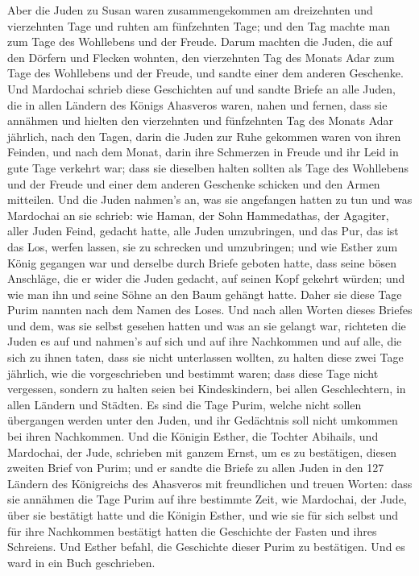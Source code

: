  Aber die Juden zu Susan waren zusammengekommen am
dreizehnten und vierzehnten Tage und ruhten am fünfzehnten Tage; und den
Tag machte man zum Tage des Wohllebens und der Freude. 
Darum machten die Juden, die auf den Dörfern und Flecken wohnten, den
vierzehnten Tag des Monats Adar zum Tage des Wohllebens und der Freude,
und sandte einer dem anderen Geschenke.  Und Mardochai
schrieb diese Geschichten auf und sandte Briefe an alle Juden, die in
allen Ländern des Königs Ahasveros waren, nahen und fernen,
 dass sie annähmen und hielten den vierzehnten und
fünfzehnten Tag des Monats Adar jährlich,  nach den
Tagen, darin die Juden zur Ruhe gekommen waren von ihren Feinden, und
nach dem Monat, darin ihre Schmerzen in Freude und ihr Leid in gute Tage
verkehrt war; dass sie dieselben halten sollten als Tage des Wohllebens
und der Freude und einer dem anderen Geschenke schicken und den Armen
mitteilen.  Und die Juden nahmen's an, was sie angefangen
hatten zu tun und was Mardochai an sie schrieb:  wie
Haman, der Sohn Hammedathas, der Agagiter, aller Juden Feind, gedacht
hatte, alle Juden umzubringen, und das Pur, das ist das Los, werfen
lassen, sie zu schrecken und umzubringen;  und wie Esther
zum König gegangen war und derselbe durch Briefe geboten hatte, dass
seine bösen Anschläge, die er wider die Juden gedacht, auf seinen Kopf
gekehrt würden; und wie man ihn und seine Söhne an den Baum gehängt
hatte.  Daher sie diese Tage Purim nannten nach dem Namen
des Loses. Und nach allen Worten dieses Briefes und dem, was sie selbst
gesehen hatten und was an sie gelangt war,  richteten die
Juden es auf und nahmen's auf sich und auf ihre Nachkommen und auf alle,
die sich zu ihnen taten, dass sie nicht unterlassen wollten, zu halten
diese zwei Tage jährlich, wie die vorgeschrieben und bestimmt waren;
 dass diese Tage nicht vergessen, sondern zu halten seien
bei Kindeskindern, bei allen Geschlechtern, in allen Ländern und
Städten. Es sind die Tage Purim, welche nicht sollen übergangen werden
unter den Juden, und ihr Gedächtnis soll nicht umkommen bei ihren
Nachkommen.  Und die Königin Esther, die Tochter
Abihails, und Mardochai, der Jude, schrieben mit ganzem Ernst, um es zu
bestätigen, diesen zweiten Brief von Purim;  und er
sandte die Briefe zu allen Juden in den 127 Ländern des Königreichs des
Ahasveros mit freundlichen und treuen Worten:  dass sie
annähmen die Tage Purim auf ihre bestimmte Zeit, wie Mardochai, der
Jude, über sie bestätigt hatte und die Königin Esther, und wie sie für
sich selbst und für ihre Nachkommen bestätigt hatten die Geschichte der
Fasten und ihres Schreiens.  Und Esther befahl, die
Geschichte dieser Purim zu bestätigen. Und es ward in ein Buch
geschrieben.

